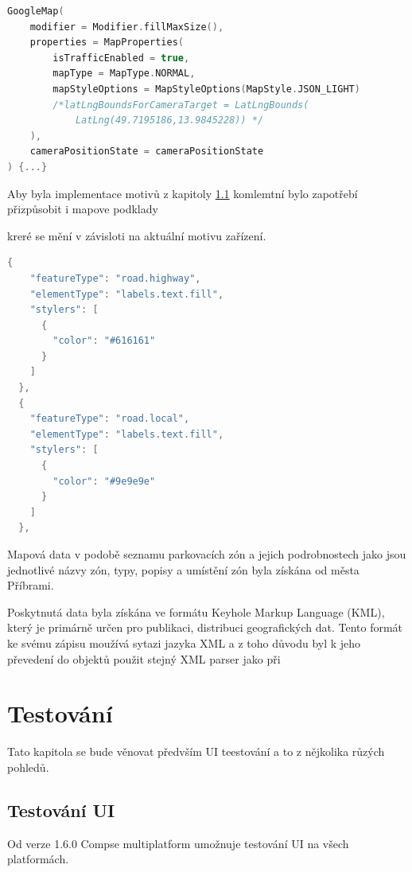 \begin{lstlisting}[caption={GoogleMap element}, label={lst:GoogleMapview}, language=kotlin]
  GoogleMap(
    modifier = Modifier.fillMaxSize(),
    properties = MapProperties(
        isTrafficEnabled = true,
        mapType = MapType.NORMAL,
        mapStyleOptions = MapStyleOptions(MapStyle.JSON_LIGHT)
        /*latLngBoundsForCameraTarget = LatLngBounds(
            LatLng(49.7195186,13.9845228)) */
    ),
    cameraPositionState = cameraPositionState
) {...}
\end{lstlisting}


Aby byla implementace motivů z kapitoly \ref{} komlemtní bylo zapotřebí přizpůsobit i mapove podklady

kreré se mění v závisloti na aktuální motivu zařízení.

\begin{lstlisting}[caption={Motiv mapy ve formátu JSON}, label={lst:MapStyle}, language=kotlin]
  {
    "featureType": "road.highway",
    "elementType": "labels.text.fill",
    "stylers": [
      {
        "color": "#616161"
      }
    ]
  },
  {
    "featureType": "road.local",
    "elementType": "labels.text.fill",
    "stylers": [
      {
        "color": "#9e9e9e"
      }
    ]
  },
\end{lstlisting}


Mapová data v podobě seznamu parkovacích zón a jejich podrobnostech jako jsou jednotlivé názvy zón, typy, popisy a umístění zón byla získána od
města Příbrami. 

Poskytnutá data byla získána ve formátu Keyhole Markup Language (KML), který je primárně určen pro publikaci, distribuci geografických dat.
Tento formát ke svému zápisu moužívá sytazi jazyka XML a z toho důvodu byl k jeho převedení do objektů použit stejný XML parser jako při 







\chapter{Testování} \label{testsSection}
Tato kapitola se bude věnovat předvším UI teestování a to z nějkolika růzých pohledů. 

\section{Testování UI}
Od verze 1.6.0 Compse multiplatform umožnuje testování UI na všech platformách. \cite{composeNews1.6.0}

